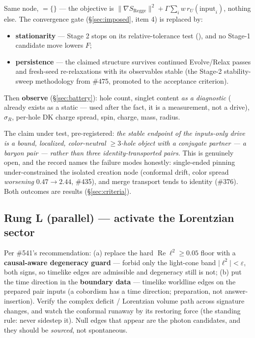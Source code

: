 \documentclass[11pt]{article}
\newcommand{\abs}[1]{\lvert #1 \rvert}
\newcommand{\norm}[1]{\lVert #1 \rVert}
\newcommand{\rU}{r_{U}}
\newcommand{\gradS}{\norm{\nabla S_{\mathrm{Regge}}}^2}
\begin{document}
Same node, \textbf{ $= \{\}$} --- the objective is
$\gradS + \Gamma \sum_i w\,\rU(\text{input}_i)$, nothing else. The convergence gate
(\S\ref{sec:imposed}, item 4) is replaced by:
\begin{itemize}[leftmargin=2em]
  \item \textbf{stationarity} --- Stage 2 stops on its relative-tolerance test
        (), and no Stage-1 candidate move lowers $F$;
  \item \textbf{persistence} --- the claimed structure survives continued Evolve/Relax
        passes and fresh-seed re-relaxations with its observables stable (the Stage-2
        stability-sweep methodology from \#475, promoted to the acceptance criterion).
\end{itemize}
Then \textbf{observe} (\S\ref{sec:battery}): hole count, singlet content \emph{as a
diagnostic} ( already exists as a static ---
used after the fact, it is a measurement, not a drive), $\sigma_R$, per-hole DK charge
spread, spin, charge, mass, radius.

The claim under test, pre-registered: \emph{the stable endpoint of the inputs-only drive
is a bound, localized, color-neutral $\geq 3$-hole object with a conjugate partner --- a
baryon pair --- rather than three identity-transported pairs.} This is genuinely open,
and the record names the failure modes honestly: single-ended pinning under-constrained
the isolated creation node (conformal drift, color spread \emph{worsening}
$0.47 \to 2.44$, \#435), and merge transport tends to identity (\#376). Both outcomes are
results (\S\ref{sec:criteria}).

\subsection{Rung L (parallel) --- activate the Lorentzian sector}
\label{sec:rungL}

Per \#541's recommendation: (a) replace the hard $\operatorname{Re}\ell^2 \geq 0.05$
floor with a \textbf{causal-aware degeneracy guard} --- forbid only the light-cone band
$\abs{\ell^2} < \varepsilon$, both signs, so timelike edges are admissible and degeneracy
still is not; (b) put the time direction in the \textbf{boundary data} --- timelike
worldline edges on the prepared pair inputs (a cobordism has a time direction;
preparation, not answer-insertion). Verify the complex deficit / Lorentzian volume path
across signature changes, and watch the conformal runaway by its restoring force (the
standing rule: never sidestep it). Null edges that appear are the photon candidates, and
they should be \emph{sourced}, not spontaneous.
\end{document}
